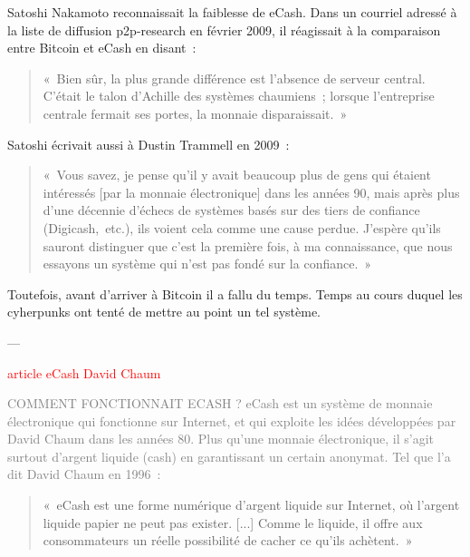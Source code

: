 Satoshi Nakamoto reconnaissait la faiblesse de eCash. Dans un courriel adressé à la liste de diffusion p2p-research en février 2009, il réagissait à la comparaison entre Bitcoin et eCash en disant~:

\begin{quote}
«~Bien sûr, la plus grande différence est l'absence de serveur central. C'était le talon d'Achille des systèmes chaumiens~; lorsque l'entreprise centrale fermait ses portes, la monnaie disparaissait.~»
\end{quote}

Satoshi écrivait aussi à Dustin Trammell en 2009~:

\begin{quote}
«~Vous savez, je pense qu'il y avait beaucoup plus de gens qui étaient intéressés [par la monnaie électronique] dans les années 90, mais après plus d'une décennie d'échecs de systèmes basés sur des tiers de confiance (Digicash,~etc.), ils voient cela comme une cause perdue. J'espère qu'ils sauront distinguer que c'est la première fois, à ma connaissance, que nous essayons un système qui n'est pas fondé sur la confiance.~»
\end{quote}

Toutefois, avant d'arriver à Bitcoin il a fallu du temps. Temps au cours duquel les cyherpunks ont tenté de mettre au point un tel système.

---

\textcolor{red}{article eCash David Chaum}

\textcolor{gray}{COMMENT FONCTIONNAIT ECASH ? eCash est un système de monnaie électronique qui fonctionne sur Internet, et qui exploite les idées développées par David Chaum dans les années 80. Plus qu'une monnaie électronique, il s'agit surtout d'argent liquide (cash) en garantissant un certain anonymat. Tel que l'a dit David Chaum en 1996~:}

\begin{quote}
«~eCash est une forme numérique d'argent liquide sur Internet, où l'argent liquide papier ne peut pas exister. [...] Comme le liquide, il offre aux consommateurs un réelle possibilité de cacher ce qu'ils achètent.~»
\end{quote}

